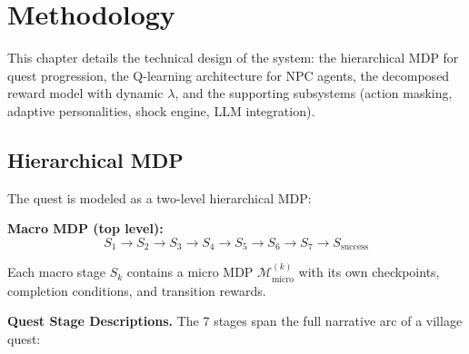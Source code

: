 \documentclass[12pt, a4paper, oneside]{report}
\begin{document}
\chapter{Methodology}
\label{chap:methodology}

This chapter details the technical design of the system: the hierarchical MDP for quest progression, the Q-learning architecture for NPC agents, the decomposed reward model with dynamic $\lambda$, and the supporting subsystems (action masking, adaptive personalities, shock engine, LLM integration).

\section{Hierarchical MDP}
\label{sec:hierarchical-mdp}

The quest is modeled as a two-level hierarchical MDP:

\textbf{Macro MDP (top level):}
\begin{equation}
    S_1 \to S_2 \to S_3 \to S_4 \to S_5 \to S_6 \to S_7 \to S_{\text{success}}
\end{equation}

Each macro stage $S_k$ contains a micro MDP $\mathcal{M}_{\text{micro}}^{(k)}$ with its own checkpoints, completion conditions, and transition rewards.

\textbf{Quest Stage Descriptions.} The 7 stages span the full narrative arc of a village quest:
\end{document}
